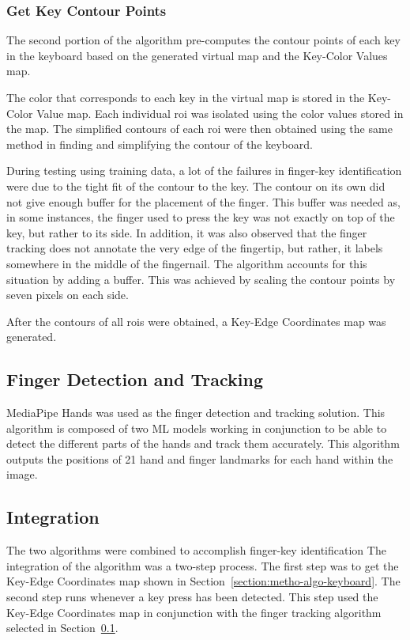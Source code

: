 \documentclass[preprint,12pt,authoryear]{elsarticle}
\begin{document}
\subsubsection{Get Key Contour Points}
The second portion of the algorithm pre-computes the contour points of each key
in the keyboard based on the generated virtual map and the Key-Color Values map.

The color that corresponds to each key in the virtual map is stored in the
Key-Color Value map. Each individual \ac{roi} was isolated using the color
values stored in the map. The simplified contours of each \ac{roi} were then
obtained using the same method in finding and simplifying the contour of the
keyboard.

During testing using training data, a lot of the failures in finger-key
identification were due to the tight fit of the contour to the key. The contour
on its own did not give enough buffer for the placement of the finger. This
buffer was needed as, in some instances, the finger used to press the key was
not exactly on top of the key, but rather to its side. In addition, it was also
observed that the finger tracking does not annotate the very edge of the
fingertip, but rather, it labels somewhere in the middle of the fingernail. The
algorithm accounts for this situation by adding a buffer. This was achieved by
scaling the contour points by seven pixels on each side.

After the contours of all \acp{roi} were obtained, a Key-Edge Coordinates map
was generated.


\subsection{Finger Detection and Tracking}
\label{section:metho-algo-finger}
MediaPipe Hands \citep{mediapipe} was used as the finger detection and tracking
solution. This algorithm is composed of two ML models working in conjunction to
be able to detect the different parts of the hands and track them accurately.
This algorithm outputs the positions of 21 hand and finger landmarks for each
hand within the image.

\subsection{Integration}

The two algorithms were combined to accomplish finger-key identification The
integration of the algorithm was a two-step process. The first step was to get
the Key-Edge Coordinates map shown in Section~\ref{section:metho-algo-keyboard}.
The second step runs whenever a key press has been detected. This step used the
Key-Edge Coordinates map in conjunction with the finger tracking algorithm
selected in Section~\ref{section:metho-algo-finger}.
\end{document}
